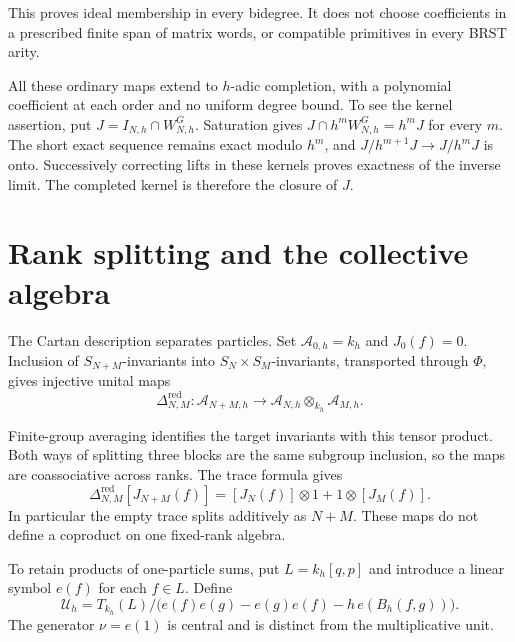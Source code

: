 This proves ideal membership in every bidegree. It does not
choose coefficients in a prescribed finite span of matrix
words, or compatible primitives in every BRST arity.

All these ordinary maps extend to $h$-adic completion, with a
polynomial coefficient at each order and no uniform degree bound.
To see the kernel assertion, put $J=I_{N,h}\cap W_{N,h}^G$.
Saturation gives $J\cap h^mW_{N,h}^G=h^mJ$ for every $m$.
The short exact sequence remains exact modulo $h^m$, and
$J/h^{m+1}J\to J/h^mJ$ is onto. Successively correcting lifts
in these kernels proves exactness of the inverse limit.
The completed kernel is therefore the closure of $J$.

\section{Rank splitting and the collective algebra}

The Cartan description separates particles. Set
$\mathcal A_{0,h}=k_h$ and $J_0(f)=0$.
Inclusion of $S_{N+M}$-invariants into
$S_N\times S_M$-invariants, transported through $\Phi$, gives
injective unital maps
\[
 \Delta^{\mathrm{red}}_{N,M}:\mathcal A_{N+M,h}
 \longrightarrow\mathcal A_{N,h}\otimes_{k_h}\mathcal A_{M,h}.
\]

Finite-group averaging identifies the target invariants with
this tensor product. Both ways of splitting three blocks are
the same subgroup inclusion, so the maps are coassociative
across ranks. The trace formula gives
\[
 \Delta^{\mathrm{red}}_{N,M}[J_{N+M}(f)]
     =[J_N(f)]\otimes1+1\otimes[J_M(f)].
\]
In particular the empty trace splits additively as $N+M$.
These maps do not define a coproduct on one fixed-rank algebra.

To retain products of one-particle sums, put $L=k_h[q,p]$ and
introduce a linear symbol $e(f)$ for each $f\in L$. Define
\begin{equation}\label{mht:eq:collective-moyal}
 \mathcal U_h=
 T_{k_h}(L)\big/
 \bigl(e(f)e(g)-e(g)e(f)-h\,e(B_h(f,g))\bigr).
\end{equation}
The generator $\nu=e(1)$ is central and is distinct from the
multiplicative unit.

